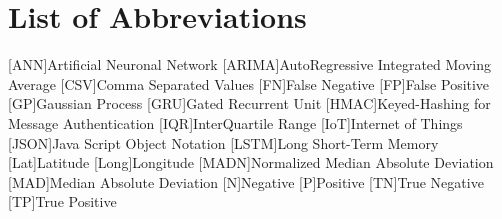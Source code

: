 \newpage





\newpage
\listoffigures


\newpage
\listoftables
\clearpage

\renewcommand\listoflistingscaption{List of source codes}
\listoflistings
\clearpage


{}
\chapter*{List of Abbreviations}
\begin{acronym}%
	[ANN]{Artificial Neuronal Network}
	[ARIMA]{AutoRegressive Integrated Moving Average}
	[CSV]{Comma Separated Values }
	[FN]{False Negative}
	[FP]{False Positive}
	[GP]{Gaussian Process}
	[GRU]{Gated Recurrent Unit}
	[HMAC]{Keyed-Hashing for Message Authentication}
	[IQR]{InterQuartile Range}
	[IoT]{Internet of Things}
	[JSON]{Java Script Object Notation}
	[LSTM]{Long Short-Term Memory}
	[Lat]{Latitude}
	[Long]{Longitude}
	[MADN]{Normalized Median Absolute Deviation}
	[MAD]{Median Absolute Deviation}
	{Negative}
	{Positive}
	[TN]{True Negative}
	[TP]{True Positive}
\end{acronym}

